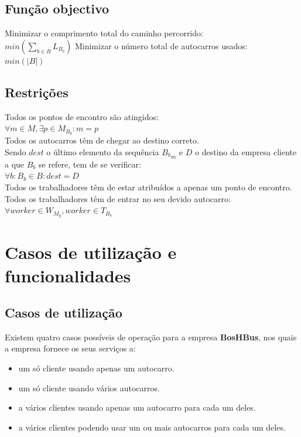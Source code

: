 \documentclass{report}
\begin{document}
  \section{Função objectivo}
    Minimizar o comprimento total do caminho percorrido:\\
    $min(\sum_{b \in B} L_{B_b})$
    \newline
    Minimizar o número total de autocarros usados:\\
    $min(|B|)$\\
    \newline
  \section{Restrições}
    Todos os pontos de encontro são atingidos:\\
    $\forall{m \in M}, \exists{p \in M_{B_b}} : m = p$\\
    \newline
    Todos os autocarros têm de chegar ao destino correto.\\
    Sendo $dest$ o último elemento da sequência ${B_b}_{m}$ e $D$ o destino da
    empresa cliente a que ${B_b}$ se refere, tem de se verificar:\\
    $\forall{b:{B_b} \in B} : dest = D$\\
    \newline
    Todos os trabalhadores têm de estar atribuídos a apenas um ponto de encontro.
    \newline
    Todos os trabalhadores têm de entrar no seu devido autocarro:\\
    $\forall{worker \in W_{M_y}}, worker \in T_{B_b}$

\chapter{Casos de utilização e funcionalidades}
  \section{Casos de utilização}
    Existem quatro casos possíveis de operação para a empresa \textbf{BosHBus},
    nos quais a empresa fornece os seus serviços a:
    \begin{itemize}
    \item um só cliente usando apenas um autocarro.
    \item um só cliente usando vários autocarros.
    \item a vários clientes usando apenas um autocarro para cada um deles.
    \item a vários clientes podendo usar um ou mais autocarros para cada um deles.
    \end{itemize}
\end{document}
